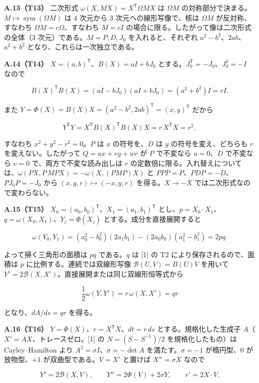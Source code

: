 \documentclass[
  a4paper,
]{ltjsarticle}
\begin{document}
\textbf{A.13（T13）} 二次形式 \(\omega(X,MX)=X^{\mathsf T}\Omega MX\) は
\(\Omega M\)
の対称部分で決まる。\(M\mapsto\operatorname{sym}(\Omega M)\) は 4
次元から 3 次元への線形写像で、核は \(\Omega M\) が反対称、すなわち
\(\Omega M=c\Omega\)、すなわち \(M=cI\)
の場合に限る。したがって像は二次形式の全体（3
次元）である。\(M=P,D,J_0\) を入れると、それぞれ
\(a^2-b^2\)、\(2ab\)、\(a^2+b^2\) となり、これらは一次独立である。

\textbf{A.14（T14）} \(X=(a,b)^{\mathsf T}\)、\(B(X)=aI+bJ_0\)
とする。\(J_0^{\mathsf T}=-J_0\)、\(J_0^2=-I\) なので

\[
B(X)^{\mathsf T}B(X)=(aI-bJ_0)(aI+bJ_0)=(a^2+b^2)I=rI.
\]

また \(Y=\Phi(X)=B(X)X=(a^2-b^2,2ab)^{\mathsf T}=(x,y)^{\mathsf T}\)
だから

\[
Y^{\mathsf T}Y=X^{\mathsf T}B(X)^{\mathsf T}B(X)X=r\,X^{\mathsf T}X=r^2,
\]

すなわち \(x^2+y^2-r^2=0\)。\(P\) は \(x\) の符号を、\(D\) は \(y\)
の符号を変え、どちらも \(r\) を変えない。したがって \(Q=ux+vy+wr\) が
\(P\) で不変なら \(u=0\)、\(D\) で不変なら \(v=0\)
で、両方で不変な読み出しは \(r\)
の定数倍に限る。入れ替えについては、\(\omega(PX,P\,MPX)=-\omega(X,(PMP)X)\)
と \(PPP=P\)、\(PDP=-D\)、\(PJ_0P=-J_0\) から \((x,y,r)\mapsto(-x,y,r)\)
を得る。\(X\to-X\) では二次形式なので変わらない。

\textbf{A.15（T15）}
\(X_0=(a_0,b_0)^{\mathsf T}\)、\(X_1=(a_1,b_1)^{\mathsf T}\)
とし、\(p=X_0\cdot X_1\)、\(q=\omega(X_0,X_1)\)、\(Y_j=\Phi(X_j)\)
とする。成分を直接展開すると

\[
\omega(Y_0,Y_1)
=(a_0^2-b_0^2)(2a_1b_1)-(2a_0b_0)(a_1^2-b_1^2)
=2pq.
\]

よって掃く三角形の面積は \(pq\) である。\(q\) は {[}1{]} の T2
により保存されるので、面積は \(p\) に比例する。連続では双線形写像
\(\mathcal B(U,V)=B(U)V\) を用いて
\(Y'=2\mathcal B(X,X')\)。直接展開または同じ双線形恒等式から

\[
\frac12\omega(Y,Y')=r\,\omega(X,X')=qr
\]

となり、\(dA/ds=qr\) を得る。

\textbf{A.16（T16）} \(Y=\Phi(X)\)、\(r=X^{\mathsf T}X\)、\(dt=r\,ds\)
とする。規格化した生成子 \(A\)（\(X'=AX\)、トレースゼロ。{[}1{]} の
\(N=(S-S^{-1})/2\) を規格化したもの）は Cayley--Hamilton より
\(A^2=\sigma I\)、\(\sigma=-\det A\) を満たす。\(\sigma=-1\)
が楕円型、\(0\) が放物型、\(+1\) が双曲型である。\(V=X'\) と置けば
\(X''=\sigma X\) なので

\[
Y'=2\mathcal B(X,V),\qquad
Y''=2\Phi(V)+2\sigma Y,\qquad
r'=2X\cdot V.
\]
\end{document}
